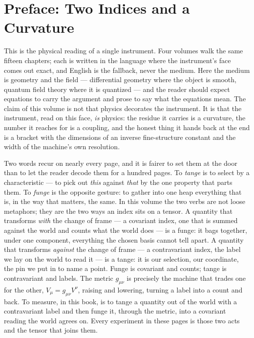 \chapter*{Preface: Two Indices and a Curvature}

This is the physical reading of a single instrument. Four volumes walk the same fifteen chapters; each is written in the
language where the instrument's face comes out exact, and English is the fallback, never the medium. Here the medium is
geometry and the field --- differential geometry where the object is smooth, quantum field theory where it is quantized ---
and the reader should expect equations to carry the argument and prose to say what the equations mean. The claim of this
volume is not that physics decorates the instrument. It is that the instrument, read on this face, \emph{is} physics: the
residue it carries is a curvature, the number it reaches for is a coupling, and the honest thing it hands back at the end is
a bracket with the dimensions of an inverse fine-structure constant and the width of the machine's own resolution.

Two words recur on nearly every page, and it is fairer to set them at the door than to let the reader decode them for a
hundred pages. To \emph{tange} is to select by a characteristic --- to pick out \emph{this} against \emph{that} by the one
property that parts them. To \emph{funge} is the opposite gesture: to gather into one heap everything that is, in the way
that matters, the same. In this volume the two verbs are not loose metaphors; they are the two ways an index sits on a
tensor. A quantity that transforms \emph{with} the change of frame --- a covariant index, one that is summed against the
world and counts what the world does --- is a funge: it bags together, under one component, everything the chosen basis
cannot tell apart. A quantity that transforms \emph{against} the change of frame --- a contravariant index, the label we
lay on the world to read it --- is a tange: it is our selection, our coordinate, the pin we put in to name a point. Funge is
covariant and counts; tange is contravariant and labels. The metric $g_{\mu\nu}$ is precisely the machine that trades one
for the other, $V_\mu = g_{\mu\nu}V^\nu$, raising and lowering, turning a label into a count and back. To measure, in this
book, is to tange a quantity out of the world with a contravariant label and then funge it, through the metric, into a
covariant reading the world agrees on. Every experiment in these pages is those two acts and the tensor that joins them.

